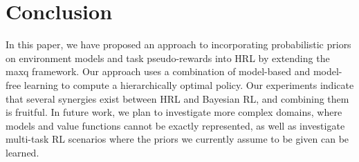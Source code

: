\section{Conclusion}
\label{sec:conclusion}

In this paper, we have proposed an approach to incorporating
probabilistic priors on environment models and task pseudo-rewards
into HRL by extending the {\sc maxq} framework. Our approach uses a
combination of model-based and model-free learning to compute a
hierarchically optimal policy. Our experiments indicate that several
synergies exist between HRL and Bayesian RL, and combining them is
fruitful. In future work, we plan to investigate more complex domains,
where models and value functions cannot be exactly represented, as well as investigate multi-task RL scenarios where the priors we currently assume to be given can be learned.

